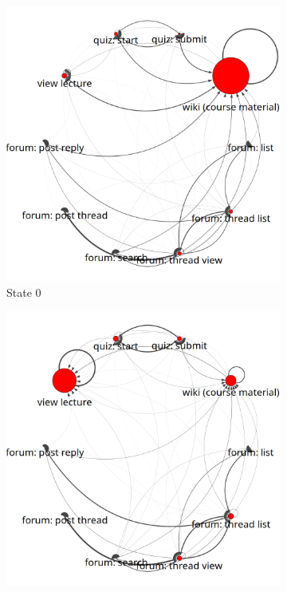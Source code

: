 \begin{figure}
  \centering
  \begin{subfigure}[t]{0.24\textwidth}
    \includegraphics[width=\textwidth]{../figures/text-4state/state0.png}
    \caption{\label{fig:state0}State 0}
  \end{subfigure}
  \begin{subfigure}[t]{0.24\textwidth}
    \includegraphics[width=\textwidth]{../figures/text-4state/state1.png}

\end{subfigure}
\end{figure}
